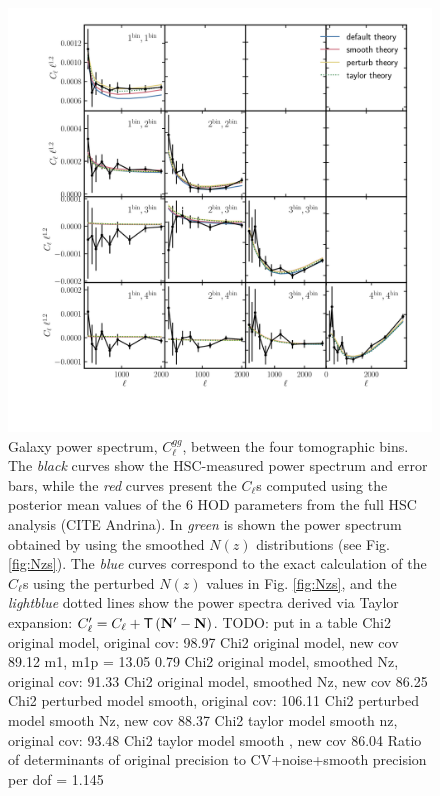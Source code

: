 \documentclass[a4paper,11pt]{article}
\newcommand{\vN}{\mathbf{N}}
\begin{document}
\begin{figure}[ht]
\centering  
\includegraphics[width=1.\textwidth]{./Cls}
\caption{Galaxy power spectrum, $C_\ell^{gg}$, between the four
tomographic bins. The \textit{black} curves show the HSC-measured
power spectrum and error bars, while the
\textit{red} curves present the $C_\ell$s
computed using the posterior mean values of the 6 HOD parameters from the
full HSC analysis (CITE Andrina). In 
\textit{green} is shown the power
spectrum obtained by using the smoothed
$N(z)$ distributions (see Fig. \ref{fig:Nzs}). The \textit{blue}
curves correspond to the exact
calculation of the $C_\ell$s using the
perturbed $N(z)$ values in
Fig. \ref{fig:Nzs}, and the 
\textit{lightblue} dotted lines
show the power spectra derived via
Taylor expansion: $C_\ell' = C_\ell +
 {\sf T} \left(\vN' - {\vN} \right)$.
TODO: put in a table
Chi2 original model, original cov: 98.97
Chi2 original model, new cov  89.12
m1, m1p =  13.05 0.79
Chi2 original model, smoothed Nz, original cov: 91.33
Chi2 original model, smoothed Nz, new cov  86.25
Chi2 perturbed model smooth, original cov: 106.11
Chi2 perturbed model smooth Nz, new cov  88.37
Chi2 taylor model smooth nz, original cov: 93.48
Chi2 taylor model smooth , new cov  86.04
Ratio of determinants of original precision to CV+noise+smooth precision per dof =  1.145}
\label{fig:Cls}
\end{figure}
\end{document}
